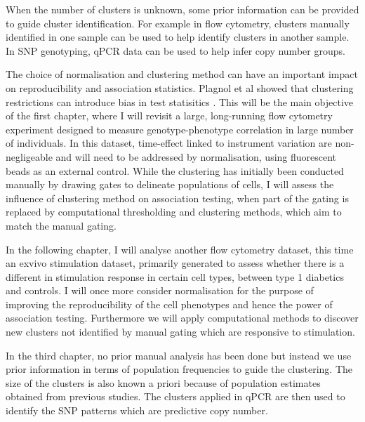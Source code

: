 When the number of clusters is unknown, some prior information can be provided to guide cluster identification.
For example in flow cytometry, clusters manually identified in one sample can be used to help identify clusters in another sample.
In SNP genotyping, qPCR data can be used to help infer copy number groups.

The choice of normalisation and clustering method can have an important impact on reproducibility and association statistics.
Plagnol et al showed that clustering restrictions can introduce bias in test statisitics \citep{Plagnol:2007bw}.
This will be the main objective of the first chapter, where I will revisit a large, long-running flow cytometry experiment
designed to measure genotype-phenotype correlation in large number of individuals.
In this dataset, time-effect linked to instrument variation are non-negligeable and will need to be addressed by normalisation,
using fluorescent beads as an external control.
While the clustering has initially been conducted manually by drawing gates to delineate populations of cells,
I will assess the influence of clustering method on association testing,
when part of the gating is replaced by computational thresholding and clustering methods, which aim
to match the manual gating.  

In the following chapter, I will analyse another flow cytometry dataset, this time an exvivo stimulation dataset,
primarily generated to assess whether there is a different in stimulation response in certain cell types, between type 1 diabetics and controls.
I will once more consider normalisation for the purpose of improving the reproducibility of the cell phenotypes and hence the power of association testing.
Furthermore we will apply computational methods to discover new clusters not identified by manual gating which are responsive to stimulation.

In the third chapter, no prior manual analysis has been done but instead we use prior information in terms of population frequencies
to guide the clustering.
The size of the clusters is also known a priori because of population estimates obtained from previous studies.
The clusters applied in qPCR are then used to identify the SNP patterns which are predictive copy number.

